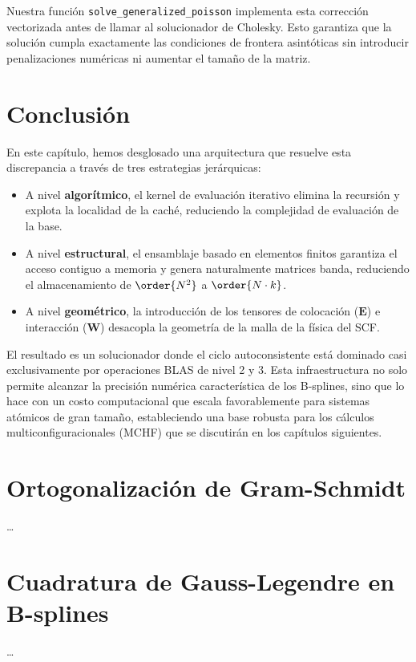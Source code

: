 Nuestra función \texttt{solve\_generalized\_poisson} implementa esta corrección vectorizada antes de llamar al solucionador de Cholesky. Esto garantiza que la solución cumpla exactamente las condiciones de frontera asintóticas sin introducir penalizaciones numéricas ni aumentar el tamaño de la matriz.

\section{Conclusión}

En este capítulo, hemos desglosado una arquitectura que resuelve esta discrepancia a través de tres estrategias jerárquicas:

\begin{itemize}
    \item A nivel \textbf{algorítmico}, el kernel de evaluación iterativo elimina la recursión y explota la localidad de la caché, reduciendo la complejidad de evaluación de la base.
    \item A nivel \textbf{estructural}, el ensamblaje basado en elementos finitos garantiza el acceso contiguo a memoria y genera naturalmente matrices banda, reduciendo el almacenamiento de \( \order{N^2} \) a \( \order{N \cdot k} \).
    \item A nivel \textbf{geométrico}, la introducción de los tensores de colocación (\(\bm{E}\)) e interacción (\(\mathbf{W}\)) desacopla la geometría de la malla de la física del SCF.
\end{itemize}

El resultado es un solucionador donde el ciclo autoconsistente está dominado casi exclusivamente por operaciones BLAS de nivel 2 y 3. Esta infraestructura no solo permite alcanzar la precisión numérica característica de los B-splines, sino que lo hace con un costo computacional que escala favorablemente para sistemas atómicos de gran tamaño, estableciendo una base robusta para los cálculos multiconfiguracionales (MCHF) que se discutirán en los capítulos siguientes.



\section{Ortogonalización de Gram-Schmidt}
\dots

\section{Cuadratura de Gauss-Legendre en B-splines}
\dots

